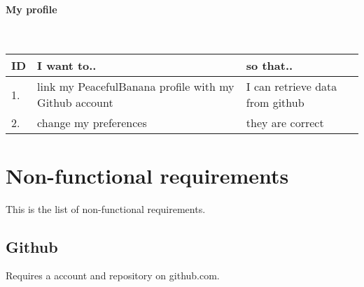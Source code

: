\paragraph{My profile}\mbox{}\\
\vspace{0.5cm}
 \begin{tabularx}{\linewidth}{| l | X | X |}
    \hline
    \rowcolor[gray]{0.8}
    \textbf{ID} & \textbf{I want to..} & \textbf{so that..} \\
    \hline
    1. & link my PeacefulBanana profile with my Github account & I can retrieve data from github\\
    2. & change my preferences  & they are correct\\
    \hline
\end{tabularx}
\vspace{0.5cm}

\section{Non-functional requirements}
This is the list of non-functional requirements.
\subsection{Github}
Requires a account and repository on github.com.
